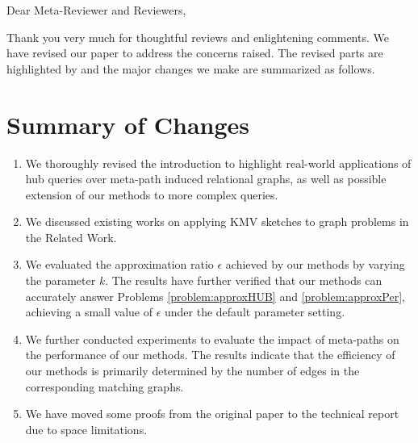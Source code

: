 \noindent
Dear Meta-Reviewer and Reviewers,

Thank you very much for thoughtful reviews and enlightening comments.
We have revised our paper to address the concerns raised.
The revised parts are highlighted by  and the major changes we make are summarized as follows.

\section*{Summary of Changes}
\begin{enumerate}
    \item We thoroughly revised the introduction to highlight real-world applications of hub queries over meta-path induced relational graphs, as well as possible extension of our methods to more complex queries.
    \item We discussed existing works on applying KMV sketches to graph problems in the Related Work.
    \item We evaluated the approximation ratio $\epsilon$ achieved by our methods by varying the parameter $k$. The results have further verified that our methods can accurately answer Problems \ref{problem:approxHUB} and \ref{problem:approxPer}, achieving a small value of $\epsilon$ under the default parameter setting.
    \item We further conducted experiments to evaluate the impact of meta-paths on the performance of our methods. The results indicate that the efficiency of our methods is primarily determined by the number of edges in the corresponding matching graphs.
    \item We have moved some proofs from the original paper to the technical report~\cite{hud2023tr} due to space limitations.
\end{enumerate}